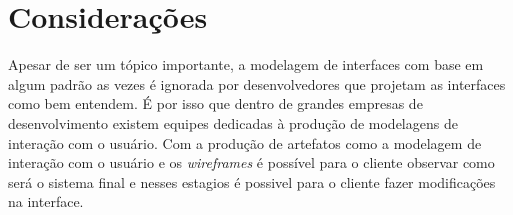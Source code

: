 \section{Considerações}
Apesar de ser um tópico importante, a modelagem de interfaces com base em algum
padrão as vezes é ignorada por desenvolvedores que projetam as interfaces como
bem entendem. É por isso que dentro de  grandes empresas
de desenvolvimento existem equipes dedicadas à produção de modelagens
de interação com o usuário. Com a produção de artefatos como a modelagem de
interação com o usuário e os \emph{wireframes} é possível para o cliente
observar como será o sistema final e nesses estagios é possivel para o cliente
fazer modificações na interface.

